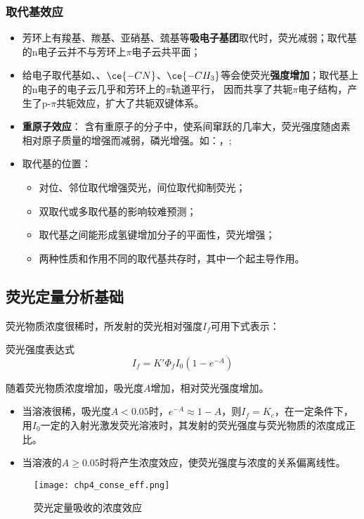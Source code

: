 \subsubsection{取代基效应}
\begin{itemize}
	\item 芳环上有羧基、羰基、亚硝基、巯基等\textbf{吸电子基团}取代时，荧光减弱；取代基的n电子云并不与芳环上$\pi$电子云共平面；
	\item 给电子取代基如、、$\ce{-CN}$、$\ce{-CH_{3}}$等会使荧光\textbf{强度增加}；取代基上的n电子的电子云几乎和芳环上的$\pi$轨道平行， 因而共享了共轭$\pi$电子结构，产生了p-$\pi$共轭效应，扩大了共轭双键体系。
	\item \textbf{重原子效应}： 含有重原子的分子中，使系间窜跃的几率大，荧光强度随卤素相对原子质量的增强而减弱，磷光增强。如：，;
	\item 取代基的位置：
	\begin{itemize}
		\item 对位、邻位取代增强荧光，间位取代抑制荧光；
		\item 双取代或多取代基的影响较难预测；
		\item 取代基之间能形成氢键增加分子的平面性，荧光增强；
		\item 两种性质和作用不同的取代基共存时，其中一个起主导作用。
	\end{itemize}
\end{itemize}

\subsection{荧光定量分析基础}
荧光物质浓度很稀时，所发射的荧光相对强度$I_{f}$可用下式表示：
\begin{theorem*}{荧光强度表达式}
	\begin{equation*}
		I_{f}=K'\Phi_{f}I_{0}(1-e^{-A})
	\end{equation*}
\end{theorem*}
随着荧光物质浓度增加，吸光度$A$增加，相对荧光强度增加。
\begin{itemize}
	\item 当溶液很稀，吸光度$A<0.05$时，$e^{-A}\approx 1-A$，则$I_{f}=K_{c}$，在一定条件下，用$I_0$一定的入射光激发荧光溶液时，其发射的荧光强度与荧光物质的浓度成正比。
	\item 当溶液的$A\geq 0.05$时将产生浓度效应，使荧光强度与浓度的关系偏离线性。
\end{itemize}
\begin{figure}
	\centering
	\texttt{[image: chp4\_conse\_eff.png]}
	\label{fig:chp4conseeff}
	\caption{荧光定量吸收的浓度效应}
\end{figure}
